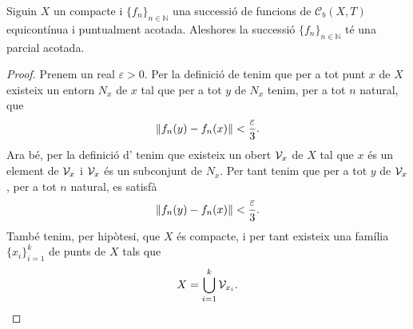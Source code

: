 \documentclass[../Apunts.tex]{subfiles}
\begin{document}
	\begin{lemma}
		\label{thm:Teorema de Arzelà-Ascoli}\label{lemma:Teorema de Peano}
		Siguin \(X\) un compacte i \(\{f_{n}\}_{n\in\mathbb{N}}\) una successió de funcions de \(\mathcal{C}_{b}(X,T)\) equicontínua i puntualment acotada. Aleshores la successió \(\{f_{n}\}_{n\in\mathbb{N}}\) té una parcial acotada.
		\begin{proof}
			Prenem un real \(\varepsilon>0\). Per la definició de  tenim que per a tot punt \(x\) de \(X\) existeix un entorn \(N_{x}\) de \(x\) tal que per a tot \(y\) de \(N_{x}\) tenim, per a tot \(n\) natural, que
			\[\norm{f_{n}(y)-f_{n}(x)}<\frac{\varepsilon}{3}.\]
			Ara bé, per la definició d' tenim que existeix un obert \(\mathcal{V}_{x}\) de \(X\) tal que \(x\) és un element de \(\mathcal{V}_{x}\) i \(\mathcal{V}_{x}\) és un subconjunt de \(N_{x}\). Per tant tenim que per a tot \(y\) de \(\mathcal{V}_{x}\), per a tot \(n\) natural, es satisfà
			\begin{equation}
				\label{thm:Teorema de Arzelà-Ascoli:eq2}
				\norm{f_{n}(y)-f_{n}(x)}<\frac{\varepsilon}{3}.
			\end{equation}
			També tenim, per hipòtesi, que \(X\) és compacte, i per tant existeix una família \(\{x_{i}\}_{i=1}^{k}\) de punts de \(X\) tals que
			\begin{equation}
				\label{thm:Teorema de Arzelà-Ascoli:eq1}
				X=\bigcup_{i=1}^{k}\mathcal{V}_{x_{i}}.
			\end{equation}
			

\end{proof}
\end{lemma}
\end{document}
